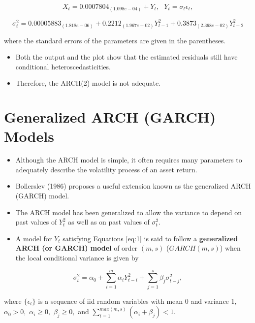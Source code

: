 \documentclass[]{book}
\providecommand{\tightlist}{%
  \setlength{\itemsep}{0pt}\setlength{\parskip}{0pt}}
\begin{document}
\[X_t = 0.0007804_{(1.098e-04)} + Y_t, \text{  }Y_t=\sigma_t\epsilon_t,\]

\[\sigma_t^2=0.00005883_{(1.818e-06)}+0.2212_{(1.967e-02)}Y_{t-1}^2 + 0.3873_{(2.368e-02)}Y_{t-2}^2\]

where the standard errors of the parameters are given in the parentheses.

\begin{itemize}
\tightlist
\item
  Both the output and the plot show that the estimated residuals still have conditional heteroscedasticities.
\item
  Therefore, the ARCH(2) model is not adequate.
\end{itemize}

\hypertarget{generalized-arch-garch-models}{%
\section{Generalized ARCH (GARCH) Models}\label{generalized-arch-garch-models}}

\begin{itemize}
\item
  Although the ARCH model is simple, it often requires many parameters to adequately describe the volatility process of an asset return.
\item
  Bollerslev (1986) proposes a useful extension known as the generalized ARCH (GARCH) model.
\item
  The ARCH model has been generalized to allow the variance to depend on past values of \(Y_t^2\) as well as on past values of \(\sigma^2_t.\)
\item
  A model for \(Y_t\) satisfying Equations \ref{eq:1} is said to follow a \textbf{generalized ARCH (or GARCH) model} of order \((m,s)\) (\(GARCH(m,s)\)) when the local conditional variance is given by
\end{itemize}

\begin{equation} \label{eq:3}
\sigma_t^2 =\alpha_0+\sum_{i=1}^m\alpha_iY_{t-i}^2+\sum_{j=1}^s\beta_j\sigma_{t-j}^2,
\end{equation}

where \(\{\epsilon_t\}\) is a sequence of iid random variables with mean 0 and variance 1, \(\alpha_0>0,\) \(\alpha_i\geq0,\) \(\beta_j\geq0,\) and
\(\sum_{i=1}^{max(m,s)}(\alpha_i+\beta_j)<1.\)
\end{document}
